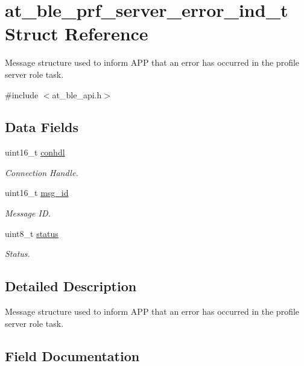 \hypertarget{structat__ble__prf__server__error__ind__t}{}\section{at\+\_\+ble\+\_\+prf\+\_\+server\+\_\+error\+\_\+ind\+\_\+t Struct Reference}
\label{structat__ble__prf__server__error__ind__t}


Message structure used to inform A\+PP that an error has occurred in the profile server role task.  




{\ttfamily \#include $<$at\+\_\+ble\+\_\+api.\+h$>$}

\subsection*{Data Fields}
\begin{DoxyCompactItemize}
\item 
uint16\+\_\+t \mbox{\hyperlink{structat__ble__prf__server__error__ind__t_a0e06225279ecca6fb6e57fe77c344f27}{conhdl}}
\begin{DoxyCompactList}\small\item\em Connection Handle. \end{DoxyCompactList}\item 
uint16\+\_\+t \mbox{\hyperlink{structat__ble__prf__server__error__ind__t_a689014fc11d4f26d264ddae2eaebc9d8}{msg\+\_\+id}}
\begin{DoxyCompactList}\small\item\em Message ID. \end{DoxyCompactList}\item 
uint8\+\_\+t \mbox{\hyperlink{structat__ble__prf__server__error__ind__t_ade818037fd6c985038ff29656089758d}{status}}
\begin{DoxyCompactList}\small\item\em Status. \end{DoxyCompactList}\end{DoxyCompactItemize}


\subsection{Detailed Description}
Message structure used to inform A\+PP that an error has occurred in the profile server role task. 

\subsection{Field Documentation}
\mbox{\label{structat__ble__prf__server__error__ind__t_a0e06225279ecca6fb6e57fe77c344f27}} 
